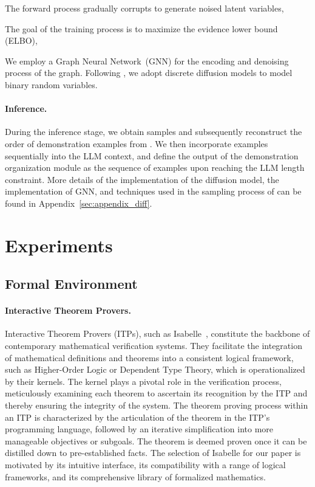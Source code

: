 \documentclass{article}
\begin{document}
The forward process gradually corrupts  to generate noised latent variables,


The goal of the training process is to maximize the evidence lower bound (ELBO),

We employ a Graph Neural Network~(GNN) for the encoding and denoising process of the graph. Following \citet{austin2021structured}, we adopt discrete diffusion models to model binary random variables. 



\paragraph{Inference.}
During the inference stage, we obtain samples  and subsequently reconstruct the order of demonstration examples from . We then incorporate examples sequentially into the LLM context, and define the output of the demonstration organization module as the sequence of examples upon reaching the LLM length constraint.
More details of the implementation of the diffusion model, the implementation of GNN, and techniques used in the sampling process of  can be found in Appendix~\ref{sec:appendix_diff}.


\section{Experiments}
\label{sec:experiment}
\subsection{Formal Environment}
\paragraph{Interactive Theorem Provers.}
Interactive Theorem Provers (ITPs), such as Isabelle~\cite{paulson1994isabelle}, constitute the backbone of contemporary mathematical verification systems. They facilitate the integration of mathematical definitions and theorems into a consistent logical framework, such as Higher-Order Logic or Dependent Type Theory, which is operationalized by their kernels. The kernel plays a pivotal role in the verification process, meticulously examining each theorem to ascertain its recognition by the ITP and thereby ensuring the integrity of the system. The theorem proving process within an ITP is characterized by the articulation of the theorem in the ITP's programming language, followed by an iterative simplification into more manageable objectives or subgoals. The theorem is deemed proven once it can be distilled down to pre-established facts. The selection of Isabelle for our paper is motivated by its intuitive interface, its compatibility with a range of logical frameworks, and its comprehensive library of formalized mathematics.
\end{document}
